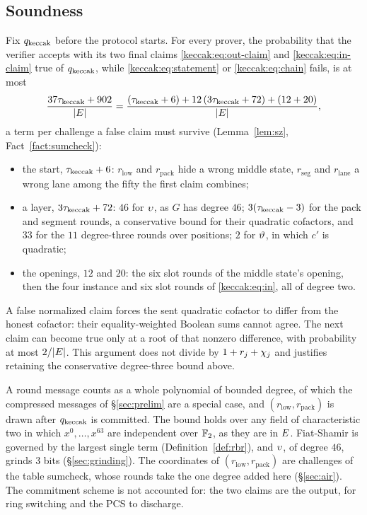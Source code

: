 \subsection{Soundness}\label{keccak:soundness}

Fix $q_{\mathrm{keccak}}$ before the protocol starts. For every prover, the probability that the verifier accepts with its two final claims \eqref{keccak:eq:out-claim} and \eqref{keccak:eq:in-claim} true of $q_{\mathrm{keccak}}$, while \eqref{keccak:eq:statement} or \eqref{keccak:eq:chain} fails, is at most
\[
\frac{37\tau_{\mathrm{keccak}}+902}{|E|}=\frac{(\tau_{\mathrm{keccak}}+6)+12\,(3\tau_{\mathrm{keccak}}+72)+(12+20)}{|E|},
\]
a term per challenge a false claim must survive (Lemma~\ref{lem:sz}, Fact~\ref{fact:sumcheck}):
\begin{itemize}
\item the start, $\tau_{\mathrm{keccak}}+6$: $r_{\mathrm{low}}$ and $r_{\mathrm{pack}}$ hide a wrong middle state, $r_{\mathrm{seg}}$ and $r_{\mathrm{lane}}$ a wrong lane among the fifty the first claim combines;
\item a layer, $3\tau_{\mathrm{keccak}}+72$: $46$ for $\upsilon$, as $G$ has degree $46$; $3(\tau_{\mathrm{keccak}}-3)$ for the pack and segment rounds, a conservative bound for their quadratic cofactors, and $33$ for the $11$ degree-three rounds over positions; $2$ for $\vartheta$, in which $c'$ is quadratic;
\item the openings, $12$ and $20$: the six slot rounds of the middle state's opening, then the four instance and six slot rounds of \eqref{keccak:eq:in}, all of degree two.
\end{itemize}
A false normalized claim forces the sent quadratic cofactor to differ from the honest cofactor: their equality-weighted Boolean sums cannot agree. The next claim can become true only at a root of that nonzero difference, with probability at most $2/|E|$. This argument does not divide by $1+r_j+\chi_j$ and justifies retaining the conservative degree-three bound above.

A round message counts as a whole polynomial of bounded degree, of which the compressed messages of \S\ref{sec:prelim} are a special case, and $(r_{\mathrm{low}},r_{\mathrm{pack}})$ is drawn after $q_{\mathrm{keccak}}$ is committed. The bound holds over any field of characteristic two in which $x^0,\dots,x^{63}$ are independent over $\mathbb{F}_2$, as they are in $E$. Fiat-Shamir is governed by the largest single term (Definition~\ref{def:rbr}), and $\upsilon$, of degree $46$, grinds $3$ bits (\S\ref{sec:grinding}). The coordinates of $(r_{\mathrm{low}},r_{\mathrm{pack}})$ are challenges of the table sumcheck, whose rounds take the one degree added here (\S\ref{sec:air}). The commitment scheme is not accounted for: the two claims are the output, for ring switching and the PCS to discharge.

